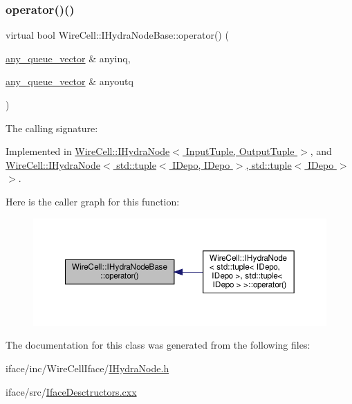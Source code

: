 \subsubsection{\texorpdfstring{operator()()}{operator()()}}
{\footnotesize\ttfamily virtual bool Wire\+Cell\+::\+I\+Hydra\+Node\+Base\+::operator() (\begin{DoxyParamCaption}\item[{\hyperlink{class_wire_cell_1_1_i_hydra_node_base_aab191670a86f2835da2aa07ab5e6372d}{any\+\_\+queue\+\_\+vector} \&}]{anyinq,  }\item[{\hyperlink{class_wire_cell_1_1_i_hydra_node_base_aab191670a86f2835da2aa07ab5e6372d}{any\+\_\+queue\+\_\+vector} \&}]{anyoutq }\end{DoxyParamCaption})\hspace{0.3cm}{\ttfamily [pure virtual]}}



The calling signature\+: 



Implemented in \hyperlink{class_wire_cell_1_1_i_hydra_node_a2178e400b1539cfb77616bfb6e842fbf}{Wire\+Cell\+::\+I\+Hydra\+Node$<$ Input\+Tuple, Output\+Tuple $>$}, and \hyperlink{class_wire_cell_1_1_i_hydra_node_a2178e400b1539cfb77616bfb6e842fbf}{Wire\+Cell\+::\+I\+Hydra\+Node$<$ std\+::tuple$<$ I\+Depo, I\+Depo $>$, std\+::tuple$<$ I\+Depo $>$ $>$}.

Here is the caller graph for this function\+:
\nopagebreak
\begin{figure}[H]
\begin{center}
\leavevmode
\includegraphics[width=350pt]{class_wire_cell_1_1_i_hydra_node_base_a7840530686daf7ba07beaf74c68b3d02_icgraph}
\end{center}
\end{figure}


The documentation for this class was generated from the following files\+:\begin{DoxyCompactItemize}
\item 
iface/inc/\+Wire\+Cell\+Iface/\hyperlink{_i_hydra_node_8h}{I\+Hydra\+Node.\+h}\item 
iface/src/\hyperlink{_iface_desctructors_8cxx}{Iface\+Desctructors.\+cxx}\end{DoxyCompactItemize}
